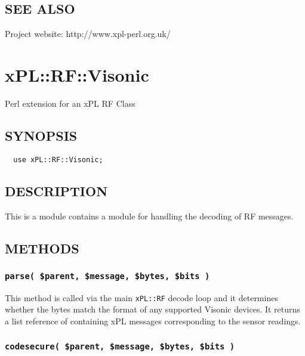 \subsection*{SEE ALSO\label{xPL::RF::RFXSensor_SEE_ALSO}}


Project website: http://www.xpl-perl.org.uk/

\section{xPL::RF::Visonic\label{xPL::RF::Visonic}}


Perl extension for an xPL RF Class

\subsection*{SYNOPSIS\label{xPL::RF::Visonic_SYNOPSIS}}
\begin{verbatim}
  use xPL::RF::Visonic;
\end{verbatim}
\subsection*{DESCRIPTION\label{xPL::RF::Visonic_DESCRIPTION}}


This is a module contains a module for handling the decoding of RF
messages.

\subsection*{METHODS\label{xPL::RF::Visonic_METHODS}}
\subsubsection*{\texttt{parse( \$parent, \$message, \$bytes, \$bits )}\label{xPL::RF::Visonic_parse_parent_message_bytes_bits_}}


This method is called via the main \texttt{xPL::RF} decode loop and it
determines whether the bytes match the format of any supported Visonic
devices.  It returns a list reference of containing xPL messages
corresponding to the sensor readings.

\subsubsection*{\texttt{codesecure( \$parent, \$message, \$bytes, \$bits )}\label{xPL::RF::Visonic_codesecure_parent_message_bytes_bits_}}


